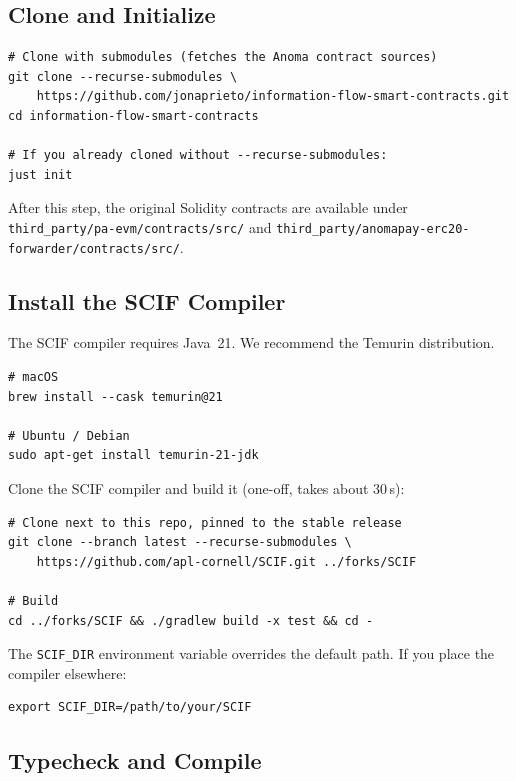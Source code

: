 \documentclass[11pt,a4paper]{article}
\begin{document}
\subsection{Clone and Initialize}

\begin{verbatim}
# Clone with submodules (fetches the Anoma contract sources)
git clone --recurse-submodules \
    https://github.com/jonaprieto/information-flow-smart-contracts.git
cd information-flow-smart-contracts

# If you already cloned without --recurse-submodules:
just init
\end{verbatim}

After this step, the original Solidity contracts are available under
\texttt{third\_party/\allowbreak{}pa-evm/\allowbreak{}contracts/\allowbreak{}src/}
and
\texttt{third\_party/\allowbreak{}anomapay-erc20-forwarder/\allowbreak{}contracts/\allowbreak{}src/}.

\subsection{Install the SCIF Compiler}

The SCIF compiler requires Java~21. We recommend the Temurin distribution.

\begin{verbatim}
# macOS
brew install --cask temurin@21

# Ubuntu / Debian
sudo apt-get install temurin-21-jdk
\end{verbatim}

Clone the SCIF compiler and build it (one-off, takes about 30\,s):

\begin{verbatim}
# Clone next to this repo, pinned to the stable release
git clone --branch latest --recurse-submodules \
    https://github.com/apl-cornell/SCIF.git ../forks/SCIF

# Build
cd ../forks/SCIF && ./gradlew build -x test && cd -
\end{verbatim}

The \texttt{SCIF\_DIR} environment variable overrides the default path.
If you place the compiler elsewhere:

\begin{verbatim}
export SCIF_DIR=/path/to/your/SCIF
\end{verbatim}

\subsection{Typecheck and Compile}
\end{document}
